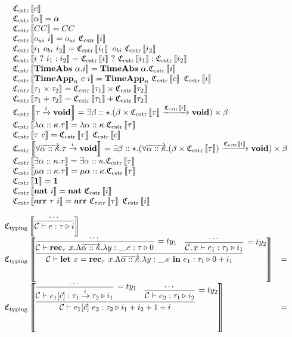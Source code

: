 \documentclass[fleqn]{article}
\begin{document}
\[
\begin{array}{l}
	\cloc{c} \\
	\cloc{\alpha} = \alpha \\
	\cloc{CC} = CC \\
	\cloc{o_{ui}~i} = o_{ui}~\cloc{i} \\
	\cloc{i_1~o_{bi}~i_2} = \cloc{i_1}~o_{bi}~\cloc{i_2} \\
	\cloc{i~?~i_1 : i_2} = \cloc{i}~?~\cloc{i_1} : \cloc{i_2} \\
	\cloc{\mathbf{TimeAbs}~\alpha.i} = \mathbf{TimeAbs}~\alpha.\cloc{i} \\
	\cloc{\mathbf{TimeApp}_n~c~i} = \mathbf{TimeApp}_n~\cloc{c}~\cloc{i} \\
	\cloc{\tau_1 \times \tau_2} = \cloc{\tau_1} \times \cloc{\tau_2} \\
	\cloc{\tau_1 + \tau_2} = \cloc{\tau_1} + \cloc{\tau_2} \\
	\cloc{\tau \xrightarrow{i} \mathbf{void}} = \exists \beta :: \star. (\beta \times \cloc{\tau} \xrightarrow{\cloc{i}} \mathbf{void}) \times \beta \\
	\cloc{\lambda \alpha :: \kappa. \tau} = \lambda \alpha :: \kappa. \cloc{\tau} \\
	\cloc{\tau~c} = \cloc{\tau}~\cloc{c} \\
	\cloc{\forall \overrightarrow{\alpha :: \kappa}. \tau \xrightarrow{i} \mathbf{void}} = \exists \beta :: \star. (\forall \overrightarrow{\alpha :: \kappa}. (\beta \times \cloc{\tau}) \xrightarrow{\cloc{i}} \mathbf{void}) \times \beta \\
	\cloc{\exists \alpha :: \kappa. \tau} = \exists \alpha :: \kappa. \cloc{\tau} \\
	\cloc{\mu \alpha :: \kappa. \tau} = \mu \alpha :: \kappa. \cloc{\tau} \\
	\cloc{\mathbf{1}} = \mathbf{1} \\
	\cloc{\mathbf{nat}~i} = \mathbf{nat}~\cloc{i} \\
	\cloc{\mathbf{arr}~\tau~i} = \mathbf{arr}~\cloc{\tau}~\cloc{i}
\end{array}
\]

\[
\begin{array}{lcl}
	\cloty{\infer{\jty{\mathcal{C}}{e}{\tau}{i}}{\cdots}} \\
	
	\cloty{\infer{\jty{\mathcal{C}}{\mathbf{let}~x=\mathbf{rec}_\tau~x.\Lambda \overrightarrow{\alpha :: \kappa}. \lambda y:\_. e ~\mathbf{in}~e_1}{\tau_1}{0 + i_1}}{\infer[=ty_1]{\jty{\mathcal{C}}{\mathbf{rec}_\tau~x.\Lambda \overrightarrow{\alpha :: \kappa}. \lambda y : 
				\_. e}{\tau}{0}}{\cdots} & \infer[=ty_2]{\jty{\mathcal{C},x}{e_1}{\tau_1}{i_1}}{\cdots}}} & = & \\
			
	\cloty{\infer{\jty{\mathcal{C}}{e_1[\vec{c}]~e_2}{\tau_2}{i_1+i_2+1+i}}{\infer[=ty_1]{\jty{\mathcal{C}}{e_1[\vec{c}]}{\tau_1 \xrightarrow{i} \tau_2}{i_1}}{\cdots} & \infer[=ty_2]{\jty{\mathcal{C}}{e_2}{\tau_1}{i_2}}{\cdots}}} & = &
\end{array}
\]
\end{document}
